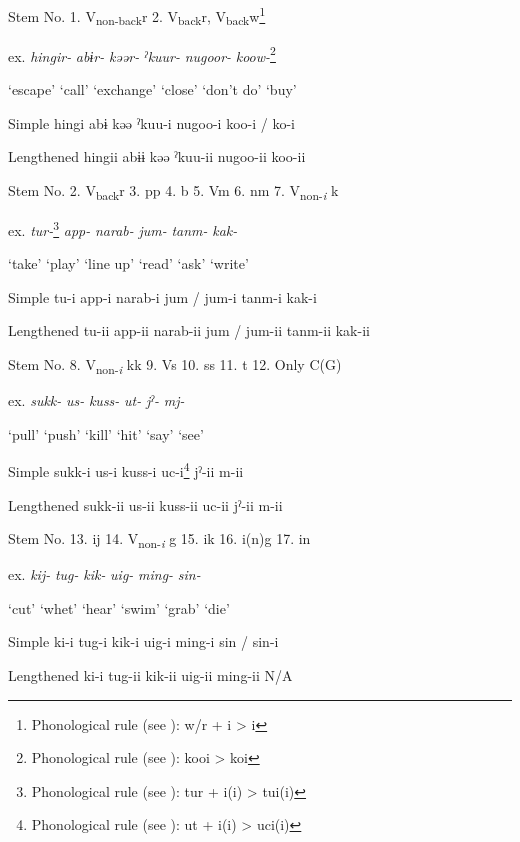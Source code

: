 \begin{table}
\caption{\label{tab:key:80}. Infinitives (simple forms and lengthened forms)}

Stem No.  1. V\textsubscript{non-back}r  2. V\textsubscript{back}r, V\textsubscript{back}w\footnote{Phonological rule (see ): w/r + i > i}

ex.  \textit{hingir-}  \textit{abɨr-}  \textit{kəər-}  \textit{ˀkuur-}  \textit{nugoor-}  \textit{koow-}\footnote{Phonological rule (see ): kooi > koi}

  ‘escape’  ‘call’  ‘exchange’  ‘close’  ‘don’t do’  ‘buy’

Simple  hingi  abɨ  kəə  ˀkuu-i  nugoo-i  koo-i / ko-i

Lengthened  hingii  abɨɨ  kəə  ˀkuu-ii  nugoo-ii  koo-ii

Stem No.  2. V\textsubscript{back}r  3. pp  4. b  5. Vm  6. nm  7. V\textsubscript{non-}\textit{\textsubscript{i} }k

ex.  \textit{tur-}\footnote{Phonological rule (see ): tur + i(i) > tui(i)}  \textit{app-}  \textit{narab-}  \textit{jum-}  \textit{tanm-}  \textit{kak-}

  ‘take’  ‘play’  ‘line up’  ‘read’  ‘ask’  ‘write’

Simple  tu-i  app-i  narab-i  jum / jum-i  tanm-i  kak-i

Lengthened  tu-ii  app-ii  narab-ii  jum / jum-ii  tanm-ii  kak-ii

Stem No.  8. V\textsubscript{non-}\textit{\textsubscript{i} }kk  9. Vs  10. ss  11. t  12. Only C(G)

ex.  \textit{sukk-}  \textit{us-}  \textit{kuss-}  \textit{ut-}  \textit{jˀ-}  \textit{mj-}

  ‘pull’  ‘push’  ‘kill’  ‘hit’  ‘say’  ‘see’

Simple  sukk-i  us-i  kuss-i  uc-i\footnote{Phonological rule (see ): ut + i(i) > uci(i)}  jˀ-ii  m-ii

Lengthened  sukk-ii  us-ii  kuss-ii  uc-ii  jˀ-ii  m-ii

Stem No.  13. ij  14. V\textsubscript{non-}\textit{\textsubscript{i}} g  15. ik  16. i(n)g    17. in

ex.  \textit{kij-}  \textit{tug-}  \textit{kik-}  \textit{uig-}  \textit{ming-}  \textit{sin-}

  ‘cut’  ‘whet’  ‘hear’  ‘swim’  ‘grab’  ‘die’

Simple  ki-i  tug-i  kik-i  uig-i  ming-i  sin / sin-i

Lengthened  ki-i  tug-ii  kik-ii  uig-ii  ming-ii  N/A
\end{table}

